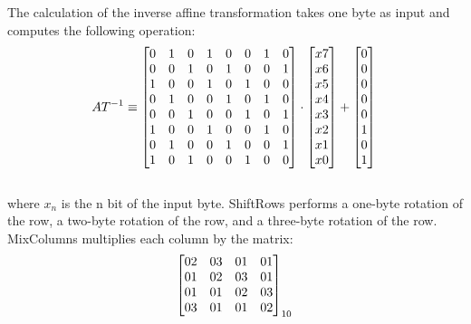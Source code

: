 The calculation of the inverse affine transformation takes one byte as input and computes the following operation:\\

\begin{equation}
AT^{-1} \equiv
\begin{bmatrix}
0  & 1  & 0  & 1  & 0  & 0  & 1  & 0 \\
0  & 0  & 1  & 0  & 1  & 0  & 0  & 1 \\
1  & 0  & 0  & 1  & 0  & 1  & 0  & 0 \\
0  & 1  & 0  & 0  & 1  & 0  & 1  & 0 \\
0  & 0  & 1  & 0  & 0  & 1  & 0  & 1 \\
1  & 0  & 0  & 1  & 0  & 0  & 1  & 0 \\
0  & 1  & 0  & 0  & 1  & 0  & 0  & 1 \\
1  & 0  & 1  & 0  & 0  & 1  & 0  & 0 \\
\end{bmatrix}
\cdot
\begin{bmatrix}
x7 \\
x6 \\
x5 \\
x4 \\
x3 \\
x2 \\
x1 \\
x0 \\
\end{bmatrix}
+
\begin{bmatrix}
0 \\
0 \\
0 \\
0 \\
0 \\
1 \\
0 \\
1 \\
\end{bmatrix}\\
\end{equation}\\

where $x_n$ is the n bit of the input byte. ShiftRows performs a one-byte rotation of the  row, a two-byte rotation of the  row, and a three-byte rotation of the  row. 
 MixColumns multiplies each column by the matrix:\\

\begin{equation}\label{eq:mixcolumns}
\begin{bmatrix}
02 & 03 & 01 & 01 \\
01 & 02 & 03 & 01 \\
01 & 01 & 02 & 03 \\
03 & 01 & 01 & 02 \\
\end{bmatrix}_{10}\\
\end{equation}\\

